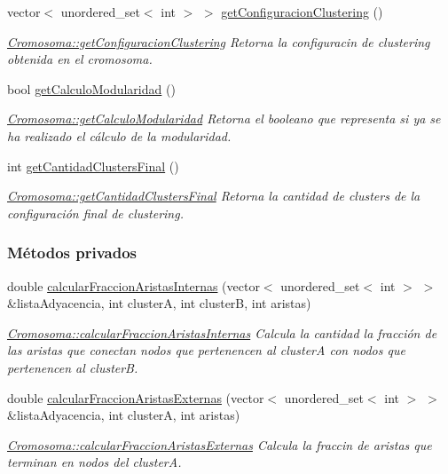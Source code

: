 \begin{DoxyCompactItemize}
vector$<$ unordered\-\_\-set$<$ int $>$ $>$ \hyperlink{class_cromosoma_afcb14040e4bae7f1e267654270f5c0a0}{get\-Configuracion\-Clustering} ()
\begin{DoxyCompactList}\small\item\em \hyperlink{class_cromosoma_afcb14040e4bae7f1e267654270f5c0a0}{Cromosoma\-::get\-Configuracion\-Clustering} Retorna la configuracin de {\itshape clustering} obtenida en el cromosoma. \end{DoxyCompactList}\item 
bool \hyperlink{class_cromosoma_a1d6c1609245c697ef2502b2da47e1375}{get\-Calculo\-Modularidad} ()
\begin{DoxyCompactList}\small\item\em \hyperlink{class_cromosoma_a1d6c1609245c697ef2502b2da47e1375}{Cromosoma\-::get\-Calculo\-Modularidad} Retorna el booleano que representa si ya se ha realizado el c\'{a}lculo de la modularidad. \end{DoxyCompactList}\item 
int \hyperlink{class_cromosoma_acd65433defe28a89eaadbd7d429be50b}{get\-Cantidad\-Clusters\-Final} ()
\begin{DoxyCompactList}\small\item\em \hyperlink{class_cromosoma_acd65433defe28a89eaadbd7d429be50b}{Cromosoma\-::get\-Cantidad\-Clusters\-Final} Retorna la cantidad de {\itshape clusters} de la configuraci\'{o}n final de {\itshape clustering}. \end{DoxyCompactList}\end{DoxyCompactItemize}
\subsubsection*{Métodos privados}
\begin{DoxyCompactItemize}
\item 
double \hyperlink{class_cromosoma_abb12b97e13cc36306a4ec775a969968b}{calcular\-Fraccion\-Aristas\-Internas} (vector$<$ unordered\-\_\-set$<$ int $>$ $>$ \&lista\-Adyacencia, int cluster\-A, int cluster\-B, int aristas)
\begin{DoxyCompactList}\small\item\em \hyperlink{class_cromosoma_abb12b97e13cc36306a4ec775a969968b}{Cromosoma\-::calcular\-Fraccion\-Aristas\-Internas} Calcula la cantidad la fracci\'{o}n de las aristas que conectan nodos que pertenencen al {\itshape cluster\-A} con nodos que pertenencen al {\itshape cluster\-B}. \end{DoxyCompactList}\item 
double \hyperlink{class_cromosoma_adf593209a71231d494979b2ceb9a3f5b}{calcular\-Fraccion\-Aristas\-Externas} (vector$<$ unordered\-\_\-set$<$ int $>$ $>$ \&lista\-Adyacencia, int cluster\-A, int aristas)
\begin{DoxyCompactList}\small\item\em \hyperlink{class_cromosoma_adf593209a71231d494979b2ceb9a3f5b}{Cromosoma\-::calcular\-Fraccion\-Aristas\-Externas} Calcula la fraccin de aristas que terminan en nodos del {\itshape cluster\-A}. \end{DoxyCompactList}\end{DoxyCompactItemize}

